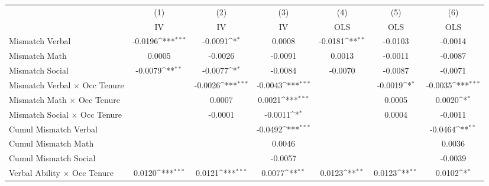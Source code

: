 {
\def\sym#1{\ifmmode^{#1}\else\(^{#1}\)\fi}
\begin{tabular}{l*{6}{c}}
\hline  
                    &\multicolumn{1}{c}{(1)}&\multicolumn{1}{c}{(2)}&\multicolumn{1}{c}{(3)}&\multicolumn{1}{c}{(4)}&\multicolumn{1}{c}{(5)}&\multicolumn{1}{c}{(6)}\\
                    &\multicolumn{1}{c}{IV}&\multicolumn{1}{c}{IV}&\multicolumn{1}{c}{IV}&\multicolumn{1}{c}{OLS}&\multicolumn{1}{c}{OLS}&\multicolumn{1}{c}{OLS}\\
\hline  
Mismatch Verbal     &     -0.0196\sym{***}&     -0.0091\sym{*}  &      0.0008         &     -0.0181\sym{**} &     -0.0103         &     -0.0014         \\
[1em]
Mismatch Math       &      0.0005         &     -0.0026         &     -0.0091         &      0.0013         &     -0.0011         &     -0.0087         \\
[1em]
Mismatch Social     &     -0.0079\sym{**} &     -0.0077\sym{*}  &     -0.0084         &     -0.0070         &     -0.0087         &     -0.0071         \\
[1em]
Mismatch Verbal $\times$ Occ Tenure&                     &     -0.0026\sym{***}&     -0.0043\sym{***}&                     &     -0.0019\sym{*}  &     -0.0035\sym{***}\\
[1em]
Mismatch Math $\times$ Occ Tenure&                     &      0.0007         &      0.0021\sym{***}&                     &      0.0005         &      0.0020\sym{*}  \\
[1em]
Mismatch Social $\times$ Occ Tenure&                     &     -0.0001         &     -0.0011\sym{*}  &                     &      0.0004         &     -0.0011         \\
[1em]
Cumul Mismatch Verbal&                     &                     &     -0.0492\sym{***}&                     &                     &     -0.0464\sym{**} \\
[1em]
Cumul Mismatch Math &                     &                     &      0.0046         &                     &                     &      0.0036         \\
[1em]
Cumul Mismatch Social&                     &                     &     -0.0057         &                     &                     &     -0.0039         \\
[1em]
Verbal Ability $\times$ Occ Tenure&      0.0120\sym{***}&      0.0121\sym{***}&      0.0077\sym{**} &      0.0123\sym{**} &      0.0123\sym{**} &      0.0102\sym{*}  \\

\end{tabular}}
